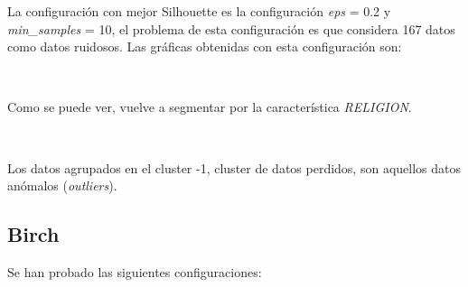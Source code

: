 \documentclass[paper=a4, fontsize=12pt]{article} %
\numberwithin{equation}{section} %
\numberwithin{figure}{section} %
\numberwithin{table}{section} %
\begin{document}
La configuración con mejor Silhouette es la configuración \textit{eps} = 0.2 y \textit{min\_samples} = 10, el problema de esta configuración es que considera 167 datos como datos ruidosos. Las gráficas obtenidas con esta configuración son:

\begin{figure}[H]
    \centering
    \mbox {
    }
\end{figure}

Como se puede ver, vuelve a segmentar por la característica \textit{RELIGION}.

\begin{figure}[H]
    \centering
    \mbox {
    }
\end{figure}

Los datos agrupados en el cluster -1, cluster de datos perdidos, son aquellos datos anómalos (\textit{outliers}).

\subsection{Birch}

Se han probado las siguientes configuraciones:
\end{document}
